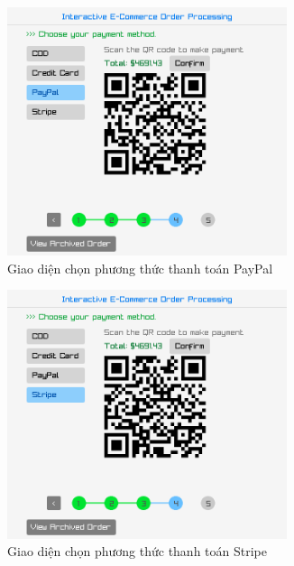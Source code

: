\begin{figure}[!ht]
  \hfill
  \begin{subfigure}{0.46\textwidth}
    \centering
    \includegraphics[width=0.9\textwidth]{../assets/screenshots/gui/payment_paypal.png}
    \caption{Giao diện chọn phương thức thanh toán PayPal}
  \end{subfigure}
  \hfill
  \begin{subfigure}{0.46\textwidth}
    \centering
    \includegraphics[width=0.9\textwidth]{../assets/screenshots/gui/payment_stripe.png}
    \caption{Giao diện chọn phương thức thanh toán Stripe}
  \end{subfigure}
  \hfill
  \begin{subfigure}{0.55\textwidth}

\end{subfigure}
\end{figure}
